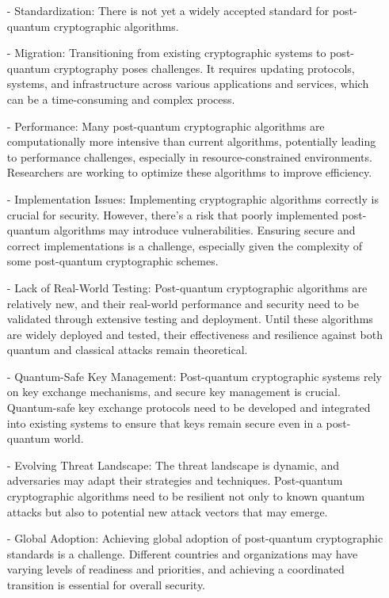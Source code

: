 \begin {itemize}
\begin{itemize}
 \item[-]   Standardization: There is not yet a widely accepted standard for post-quantum cryptographic algorithms. 
 \item[-]  Migration: Transitioning from existing cryptographic systems to post-quantum cryptography poses challenges. It requires updating protocols, systems, and infrastructure across various applications and services, which can be a time-consuming and complex process.
 \item[-]     Performance: Many post-quantum cryptographic algorithms are computationally more intensive than current algorithms, potentially leading to performance challenges, especially in resource-constrained environments. Researchers are working to optimize these algorithms to improve efficiency.
  \item[-]    Implementation Issues: Implementing cryptographic algorithms correctly is crucial for security. However, there's a risk that poorly implemented post-quantum algorithms may introduce vulnerabilities. Ensuring secure and correct implementations is a challenge, especially given the complexity of some post-quantum cryptographic schemes.
  \item[-]    Lack of Real-World Testing: Post-quantum cryptographic algorithms are relatively new, and their real-world performance and security need to be validated through extensive testing and deployment. Until these algorithms are widely deployed and tested, their effectiveness and resilience against both quantum and classical attacks remain theoretical.
  \item[-]    Quantum-Safe Key Management: Post-quantum cryptographic systems rely on key exchange mechanisms, and secure key management is crucial. Quantum-safe key exchange protocols need to be developed and integrated into existing systems to ensure that keys remain secure even in a post-quantum world.
 \item[-]     Evolving Threat Landscape: The threat landscape is dynamic, and adversaries may adapt their strategies and techniques. Post-quantum cryptographic algorithms need to be resilient not only to known quantum attacks but also to potential new attack vectors that may emerge.
  \item[-]    Global Adoption: Achieving global adoption of post-quantum cryptographic standards is a challenge. Different countries and organizations may have varying levels of readiness and priorities, and achieving a coordinated transition is essential for overall security.
 \end{itemize}
 

\end{itemize}
